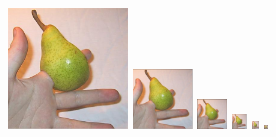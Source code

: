 \documentclass[a4paper,10pt]{article}\large
\begin{document}
\begin{figure}[!ht]
\begin{minipage}[c]{0.1\textwidth}
\centering
\includegraphics[width=1.25in]{figures/pyramidal_0.png}
\end{minipage} 
\hspace{12ex}
\begin{minipage}[c]{0.1\textwidth}
\centering
\includegraphics[width=0.625in]{figures/pyramidal_1.png}
\end{minipage}
\hspace{1ex}
\begin{minipage}[c]{0.1\textwidth}
\centering
\includegraphics[width=0.3125in]{figures/pyramidal_2.png}
\end{minipage}
\begin{minipage}[c]{0.1\textwidth}
\centering
\includegraphics[width=0.15625in]{figures/pyramidal_3.png}
\end{minipage}
\begin{minipage}[c]{0.1\textwidth}
\centering
\includegraphics[width=0.078125in]{figures/pyramidal_4.png}
\end{minipage}
\begin{minipage}[c]{0.1\textwidth}
\centering
\includegraphics[width=0.0390625in]{figures/pyramidal_5.png}
\end{minipage}
\begin{minipage}[c]{0.1\textwidth}

\end{minipage}
\end{figure}
\end{document}
